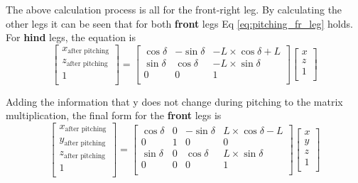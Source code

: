 The above calculation process is all for the front-right leg. By calculating the other legs it can be seen that for both \textbf{front} legs Eq \ref{eq:pitching_fr_leg} holds. For \textbf{hind} legs, the equation is
\begin{equation}
   \begin{bmatrix}
   x_\text{after pitching} \\
   z_\text{after pitching} \\
   1                       \\
   \end{bmatrix}
   =
   \begin{bmatrix}
   \cos\delta & -\sin\delta & -L \times \cos\delta + L \\
   \sin\delta & \cos\delta & -L \times \sin\delta \\
   0 & 0 & 1 \\
   \end{bmatrix}
   \begin{bmatrix}
   x \\
   z \\
   1 \\
   \end{bmatrix}
\end{equation}

Adding the information that y does not change during pitching to the matrix multiplication, the final form for the \textbf{front} legs is
\begin{equation}
   \begin{bmatrix}
   x_\text{after pitching} \\
   y_\text{after pitching} \\
   z_\text{after pitching} \\
   1                       \\
   \end{bmatrix}
   =
   \begin{bmatrix}
   \cos\delta & 0 & -\sin\delta & L \times \cos\delta - L \\
   0 & 1 & 0 & 0 \\
   \sin\delta & 0 & \cos\delta & L \times \sin\delta \\
   0 & 0 & 0 & 1 \\
   \end{bmatrix}
   \begin{bmatrix}
   x \\
   y \\
   z \\
   1 \\
   \end{bmatrix}
\end{equation}

